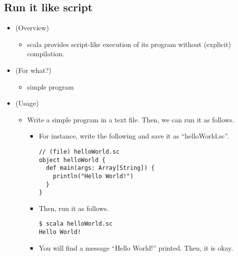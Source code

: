 \documentclass[11pt]{article}
\begin{document}
\subsection*{Run it like script}
\label{sec:orgheadline8}
\begin{itemize}
\item (Overview)
\begin{itemize}
\item scala provides script-like execution of its program without
(explicit) compilation.
\end{itemize}
\item (For what?)
\begin{itemize}
\item simple program
\end{itemize}
\item (Usage)
\begin{itemize}
\item Write a simple program in a text file. Then, we can run it as
follows.
\begin{itemize}
\item For instance, write the following and save it as ``helloWorld.sc''.
\begin{verbatim}
// (file) helloWorld.sc
object helloWorld {
  def main(args: Array[String]) {
    println("Hello World!")
  }
}
\end{verbatim}
\item Then, run it as follows.
\begin{verbatim}
$ scala helloWorld.sc 
Hello World!
\end{verbatim}
\item You will find a message ``Hello World!'' printed. Then, it is okay.
\end{itemize}
\end{itemize}
\end{itemize}
\end{document}
